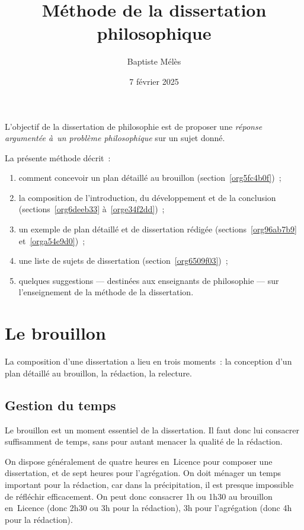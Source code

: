 \documentclass[a4paper,12pt]{report}
\author{Baptiste Mélès}
\date{7 février 2025}
\title{Méthode de la dissertation philosophique}
\begin{document}
\maketitle
\bigskip

L'objectif de la dissertation de philosophie est de proposer une
\emph{réponse argumentée à un problème philosophique} sur un sujet donné.

La présente méthode décrit :
\begin{enumerate}
\item comment concevoir un plan détaillé au brouillon (section \ref{org5fc4b0f}) ;
\item la composition de l'introduction, du développement et de la conclusion
(sections \ref{org6deeb33} à \ref{orge34f2dd}) ;
\item un exemple de plan détaillé et de dissertation rédigée
(sections \ref{org96ab7b9} et \ref{orga54e9d0}) ;
\item une liste de sujets de dissertation (section \ref{org6509f03}) ;
\item quelques suggestions — destinées aux enseignants de philosophie — sur
l'enseignement de la méthode de la dissertation.
\end{enumerate}

\setcounter{tocdepth}{3}
\tableofcontents

\part{Le brouillon}
\label{sec:orgce655c1}
\label{org5fc4b0f}

La composition d'une dissertation a lieu en trois moments : la
conception d'un plan détaillé au brouillon, la rédaction, la relecture.

\chapter{Gestion du temps}
\label{sec:orgfff29fc}

Le brouillon est un moment essentiel de la dissertation. Il faut donc
lui consacrer suffisamment de temps, sans pour autant menacer la qualité
de la rédaction.

On dispose généralement de quatre heures en Licence pour composer une
dissertation, et de sept heures pour l'agrégation. On doit ménager un
temps important pour la rédaction, car dans la précipitation, il est
presque impossible de réfléchir efficacement. On peut donc consacrer 1h
ou 1h30 au brouillon en Licence (donc 2h30 ou 3h pour la rédaction), 3h
pour l'agrégation (donc 4h pour la rédaction).
\end{document}

